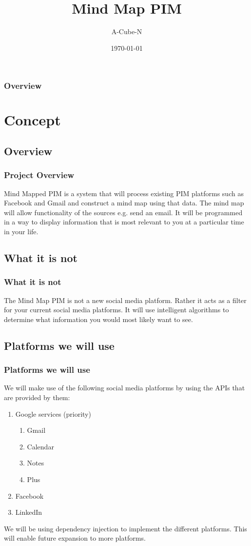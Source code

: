 \documentclass{beamer}
\title[Mind Map PIM]{Mind Map PIM}
\author{A-Cube-N}
\institute[UP]{
	Department of Computer Science, University of Pretoria
}
\date{\today}
\begin{document}
\begin{frame}
	\titlepage
\end{frame}

\begin{frame}
	\frametitle{Overview}
	\tableofcontents
\end{frame}

\section{Concept}
	\subsection{Overview}
		\begin{frame}
		\frametitle{Project Overview}
			Mind Mapped PIM is a system that will process existing PIM platforms such as Facebook and Gmail and construct a mind map using that data. 
			The mind map will allow functionality of the sources e.g. send an email. It will be programmed in a way to display information that is most relevant to you at a particular time in your life.
		\end{frame}
	
	\subsection{What it is not}
		\begin{frame}
		\frametitle{What it is not}
			The Mind Map PIM is not a new social media platform. Rather it acts as a filter for your current social media platforms.  It will use intelligent algorithms to determine what information you would most likely want to see.
		\end{frame}
			
	\subsection{Platforms we will use}
		\begin{frame}
		\frametitle{Platforms we will use}
			We will make use of the following social media platforms by using the APIs that are provided by them:
			\begin{enumerate}
				\item Google services (priority)
					\begin{enumerate}
						\item Gmail
						\item Calendar
						\item Notes
						\item Plus
					\end{enumerate}
				\item Facebook
				\item LinkedIn
			\end{enumerate}
			We will be using dependency injection to implement the different platforms. This will enable future expansion to more platforms.
		\end{frame}
		
\end{document}
